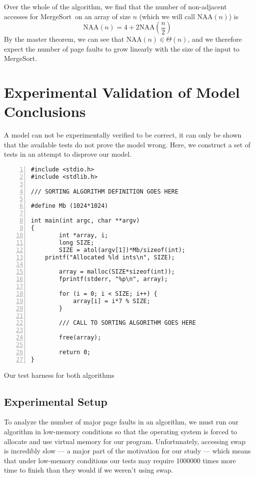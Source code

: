 \documentclass{acmtrans2m}
\newcommand{\mergesort}{{\sc MergeSort}}
\newcommand{\NAA}{\textrm{NAA}}
\begin{document}
Over the whole of the algorithm, we find that the number of non-adjacent
accesses for \mergesort\ on an array of size $n$ (which we will call $\NAA(n)$)
is $$\NAA(n) = 4 + 2\NAA\left(\frac{n}{2}\right)$$ By the master theorem, we
can see that $\NAA(n) \in \Theta(n)$, and we therefore expect the number of
page faults to grow linearly with the size of the input to \mergesort.

\section{Experimental Validation of Model Conclusions} 
\label{experiment}

A model can not be experimentally verified to be correct, it can only be shown
that the available tests do not prove the model wrong.  Here, we construct a
set of tests in an attempt to disprove our model.

\begin{narrowfig}{3in}
\begin{Verbatim}[numbers=left,numbersep=3pt,xleftmargin=20pt]
#include <stdio.h>
#include <stdlib.h>

/// SORTING ALGORITHM DEFINITION GOES HERE

#define Mb (1024*1024)

int main(int argc, char **argv)
{
        int *array, i;
        long SIZE;
        SIZE = atol(argv[1])*Mb/sizeof(int);
	printf("Allocated %ld ints\n", SIZE);

        array = malloc(SIZE*sizeof(int));
        fprintf(stderr, "%p\n", array);
        
        for (i = 0; i < SIZE; i++) {
            array[i] = i*7 % SIZE;
        }

        /// CALL TO SORTING ALGORITHM GOES HERE

        free(array);

        return 0;
}
\end{Verbatim}
\caption{Our test harness for both algorithms}
\label{fig:harness}
\end{narrowfig}
\subsection{Experimental Setup}

To analyze the number of major page faults in an algorithm, we must run our
algorithm in low-memory conditions so that the operating system is forced to
allocate and use virtual memory for our program.  Unfortunately, accessing swap
is incredibly slow --- a major part of the motivation for our study --- which
means that under low-memory conditions our tests may require 1000000 times more
time to finish than they would if we weren't using swap.  
\end{document}
